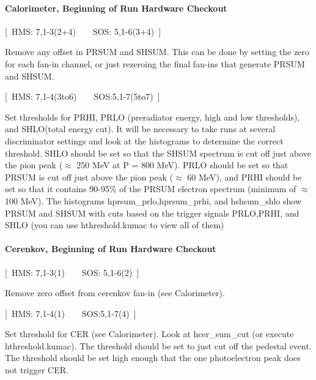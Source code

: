 \paragraph{Calorimeter, Beginning of Run Hardware Checkout}

\begin{description}
\item{[~HMS: 7,1-3(2+4)~~~~SOS: 5,1-6(3+4)~]}
\end{description}

Remove any offset in PRSUM and SHSUM. This can be done by setting
the zero for each fan-in channel, or just rezeroing the final fan-ins that
generate PRSUM and SHSUM.

\begin{description}
\item{[~HMS: 7,1-4(3to6)~~~~SOS:5,1-7(5to7)~]}
\end{description}

Set thresholds for PRHI, PRLO (preradiator energy, high and low
thresholds), and SHLO(total energy cut). It will be necessary to take
runs at several discriminator settings and look at the histograms to determine
the correct threshold. SHLO should be set so that the SHSUM spectrum is
cut off just above the pion peak ($\approx$ 250 MeV at P = 800 MeV).
PRLO should be set so that PRSUM is cut off just above the pion peak
($\approx$ 60 MeV), and PRHI should be set so that it contains 90-95\%
of the PRSUM electron spectrum (minimum of $\approx$ 100 MeV).
The histograms hprsum\_prlo,hprsum\_prhi, and hshsum\_shlo show PRSUM
and SHSUM with cuts based on the trigger signals PRLO,PRHI, and SHLO (you can
use hthreshold.kumac to view all of them)

\paragraph{Cerenkov, Beginning of Run Hardware Checkout}

\begin{description}
\item{[~HMS: 7,1-3(1)~~~~SOS: 5,1-6(2)~]}
\end{description}

Remove zero offset from cerenkov fan-in (see Calorimeter).

\begin{description}
\item{[~HMS: 7,1-4(1)~~~~SOS:5,1-7(4)~]}
\end{description}

Set threshold for CER (see Calorimeter). Look at hcer\_sum\_cut (or
execute hthreshold.kumac). The threshold should be set to just cut off the
pedestal event. The threshold should be set high enough that the one
photoelectron peak does not trigger CER.

